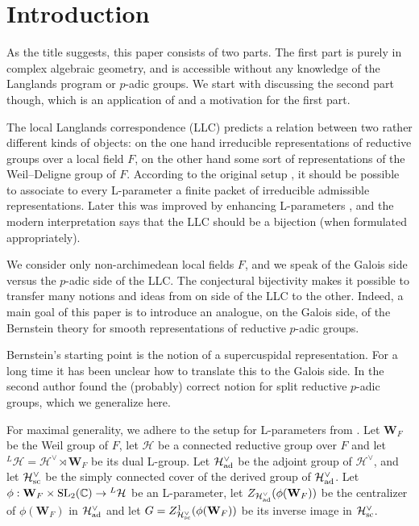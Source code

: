 \documentclass[11pt]{amsart}
\theoremstyle{definition}
\newcommand{\mb}{\mathbf}
\newcommand{\C}{\mathbb C}
\def\SL{{\rm SL}}
\def\cH{{\mathcal H}}
\def\ad{{\rm ad}}
\def\sc{{\rm sc}}
\begin{document}

\tableofcontents


\section*{Introduction}

As the title suggests, this paper consists of two parts. The first part is purely in
complex algebraic geometry, and is accessible without any knowledge of the Langlands
program or $p$-adic groups. We start with discussing the second part though,
which is an application of and a motivation for the first part.

The local Langlands correspondence (LLC) predicts a relation between two rather 
different kinds of objects: on the one hand irreducible representations of 
reductive groups over a local field $F$, on the other hand some sort of 
representations of the Weil--Deligne group of $F$. According to the original setup 
\cite{Bor,Lan1}, it should be possible to associate to every L-parameter a finite 
packet of irreducible admissible representations. Later this was improved by 
enhancing L-parameters \cite{Lus0,KaLu}, and the modern interpretation \cite{ABPS7,Vog} 
says that the LLC should be a bijection (when formulated appropriately).

We consider only non-archimedean local fields $F$, and we speak of the Galois
side versus the $p$-adic side of the LLC. The conjectural bijectivity makes it
possible to transfer many notions and ideas from on side of the LLC to the other. 
Indeed, a main goal of this paper is to introduce an analogue, on the Galois side,
of the Bernstein theory \cite{BeDe} for smooth representations of reductive 
$p$-adic groups. 

Bernstein's starting point is the notion of a supercuspidal representation. For
a long time it has been unclear how to translate this to the Galois side.
In \cite[Def. 4.12]{Mou} the second author found the (probably) correct notion for
split reductive $p$-adic groups, which we generalize here.

For maximal generality, we adhere to the setup for L-parameters from  \cite{Art2}.
Let $\mb W_F$ be the Weil group of $F$, let $\cH$ be a connected reductive group 
over $F$ and let ${}^L \cH = \cH^\vee \rtimes \mb W_F$ be its dual L-group.
Let $\cH^\vee_\ad$ be the adjoint group of $\cH^\vee$, and let $\cH^\vee_\sc$ be the 
simply connected cover of the derived group of $\cH^\vee_\ad$. 
Let $\phi : \mb W_F \times \SL_2 (\C) \to {}^L \cH$ be an L-parameter, let 
$Z_{\cH^\vee_\ad}(\phi (\mb W_F))$ be the centralizer of $\phi (\mb W_F)$ in 
$\cH^\vee_\ad$ and let $G = Z^1_{\cH^\vee_\sc}(\phi (\mb W_F))$ be its
inverse image in $\cH^\vee_\sc$.
\end{document}
